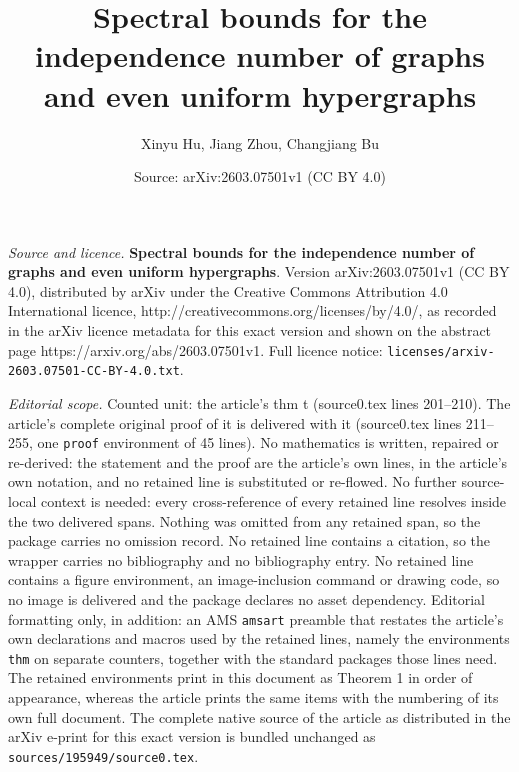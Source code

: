 \documentclass[10pt,a4paper]{amsart}
\title{\textbf{Spectral bounds for the independence number of graphs and even uniform hypergraphs}}
\author{Xinyu Hu, Jiang Zhou, Changjiang Bu}
\date{Source: arXiv:2603.07501v1 (CC BY 4.0)}
\begin{document}
\maketitle

\noindent\emph{Source and licence.} \textbf{Spectral bounds for the independence number of graphs and even uniform hypergraphs}. Version arXiv:2603.07501v1 (CC BY 4.0), distributed by arXiv under the Creative Commons Attribution 4.0 International licence, http://creativecommons.org/licenses/by/4.0/, as recorded in the arXiv licence metadata for this exact version and shown on the abstract page https://arxiv.org/abs/2603.07501v1. Full licence notice: \texttt{licenses/arxiv-2603.07501-CC-BY-4.0.txt}.\par\smallskip

\noindent\textit{Editorial scope.} Counted unit: the article's thm t (source0.tex lines 201--210). The article's complete original proof of it is delivered with it (source0.tex lines 211--255, one \texttt{proof} environment of 45 lines). No mathematics is written, repaired or re-derived: the statement and the proof are the article's own lines, in the article's own notation, and no retained line is substituted or re-flowed.  No further source-local context is needed: every cross-reference of every retained line resolves inside the two delivered spans.  Nothing was omitted from any retained span, so the package carries no omission record.  No retained line contains a citation, so the wrapper carries no bibliography and no bibliography entry.  No retained line contains a figure environment, an image-inclusion command or drawing code, so no image is delivered and the package declares no asset dependency.  Editorial formatting only, in addition: an AMS \texttt{amsart} preamble that restates the article's own declarations and macros used by the retained lines, namely the environments \texttt{thm} on separate counters, together with the standard packages those lines need.  The retained environments print in this document as Theorem 1 in order of appearance, whereas the article prints the same items with the numbering of its own full document.  The complete native source of the article as distributed in the arXiv e-print for this exact version is bundled unchanged as \texttt{sources/195949/source0.tex}.
\end{document}
